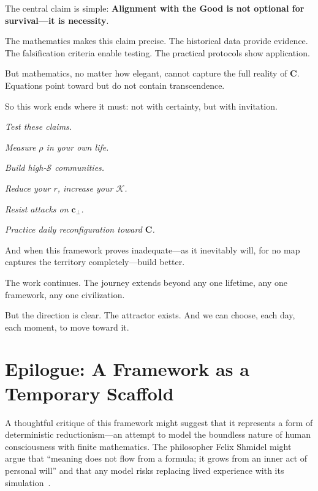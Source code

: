 \documentclass[11pt,a4paper]{article}
\theoremstyle{definition}
\theoremstyle{remark}
\newcommand{\cc}{\mathbf{c}}
\begin{document}
\begin{enumerate}
\begin{protocol}
The central claim is simple: \textbf{Alignment with the Good is not optional for survival—it is necessity}.

The mathematics makes this claim precise. The historical data provide evidence. The falsification criteria enable testing. The practical protocols show application.

But mathematics, no matter how elegant, cannot capture the full reality of \(\mathbf{C}\). Equations point toward but do not contain transcendence.

So this work ends where it must: not with certainty, but with invitation.

\textit{Test these claims.}

\textit{Measure \(\rho\) in your own life.}

\textit{Build high-\(\mathcal{S}\) communities.}

\textit{Reduce your \(r\), increase your \(\mathcal{K}\).}

\textit{Resist attacks on \(\cc_\perp\).}

\textit{Practice daily reconfiguration toward \(\mathbf{C}\).}

And when this framework proves inadequate—as it inevitably will, for no map captures the territory completely—build better.

The work continues. The journey extends beyond any one lifetime, any one framework, any one civilization.

But the direction is clear. The attractor exists. And we can choose, each day, each moment, to move toward it.



\section*{Epilogue: A Framework as a Temporary Scaffold}

A thoughtful critique of this framework might suggest that it represents a form of deterministic reductionism—an attempt to model the boundless nature of human consciousness with finite mathematics. The philosopher Felix Shmidel might argue that ``meaning does not flow from a formula; it grows from an inner act of personal will'' and that any model risks replacing lived experience with its simulation~\cite{shmidel_6351, shmidel_6355_6356}.


\end{protocol}
\end{enumerate}
\end{document}
